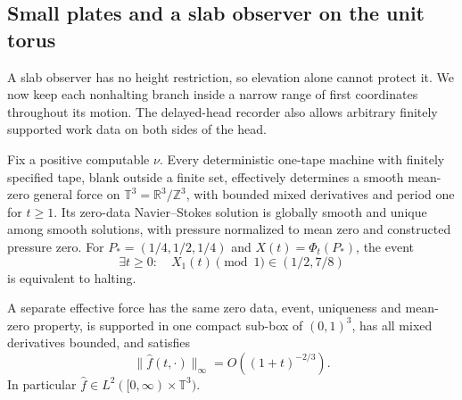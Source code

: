 \subsection{Small plates and a slab observer on the unit torus}
\label{ba:torus-plates-section}

A slab observer has no height restriction, so elevation alone cannot
protect it.  We now keep each nonhalting branch inside a narrow range of
first coordinates throughout its motion.  The delayed-head recorder also
allows arbitrary finitely supported work data on both sides of the head.

\begin{theorem}
\label{ba:torus-plates}
Fix a positive computable $\nu$.  Every deterministic one-tape machine
with finitely specified tape, blank outside a finite set, effectively
determines a smooth mean-zero general force on
$\mathbb T^3=\mathbb R^3/\mathbb Z^3$, with bounded mixed derivatives
and period one for $t\ge1$.  Its zero-data Navier--Stokes solution is
globally smooth and unique among smooth solutions, with pressure normalized
to mean zero and constructed pressure zero.  For
$P_*=(1/4,1/2,1/4)$ and $X(t)=\Phi_t(P_*)$, the event
\begin{equation}\label{ba:torus-plate-event}
 \exists t\ge0:\quad X_1(t)\pmod1\in(1/2,7/8)
\end{equation}
is equivalent to halting.

A separate effective force has the same zero data, event, uniqueness and
mean-zero property, is supported in one compact sub-box of $(0,1)^3$,
has all mixed derivatives bounded, and satisfies
\begin{equation}\label{ba:cube-rate}
 \|\widehat f(t,\cdot)\|_\infty=O((1+t)^{-2/3}).
\end{equation}
In particular $\widehat f\in L^2([0,\infty)\times\mathbb T^3)$.
\end{theorem}

